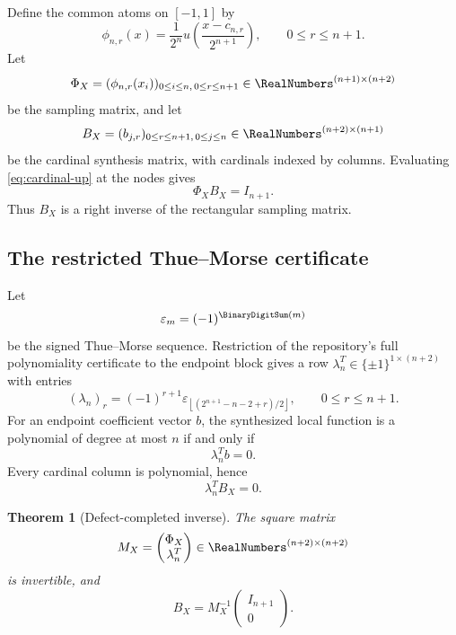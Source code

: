 \documentclass[11pt,oneside]{article}
\newtheorem{theorem}{Theorem}[section]
\theoremstyle{definition}
\theoremstyle{remark}
\newcommand{\eps}{\varepsilon}
\newcommand{\1}{\mathbf{1}}
\begin{document}
Define the common atoms on $[-1,1]$ by
\begin{equation}
 \phi_{n,r}(x)=\frac1{2^n}
 u\!\left(\frac{x-c_{n,r}}{2^{n+1}}\right),
 \qquad 0\le r\le n+1.
 \label{eq:phi-x}
\end{equation}
Let
\begin{equation}
 \Phi_X=(\phi_{n,r}(x_i))_{0\le i\le n,\,0\le r\le n+1}
 \in\RealNumbers^{(n+1)\times(n+2)}
 \label{eq:Phi}
\end{equation}
be the sampling matrix, and let
\begin{equation}
 B_X=(b_{j,r})_{0\le r\le n+1,\,0\le j\le n}
 \in\RealNumbers^{(n+2)\times(n+1)}
 \label{eq:B}
\end{equation}
be the cardinal synthesis matrix, with cardinals indexed by columns.
Evaluating \eqref{eq:cardinal-up} at the nodes gives
\begin{equation}
 \Phi_XB_X=I_{n+1}.
 \label{eq:right-inverse}
\end{equation}
Thus $B_X$ is a right inverse of the rectangular sampling matrix.

\subsection{The restricted Thue--Morse certificate}

Let
\[
 \eps_m=(-1)^{\BinaryDigitSum(m)}
\]
be the signed Thue--Morse sequence.  Restriction of the repository's full
polynomiality certificate to the endpoint block gives a row
$\lambda_n^T\in\{\pm1\}^{1\times(n+2)}$ with entries
\begin{equation}
 (\lambda_n)_r=(-1)^{r+1}
 \eps_{\left\lfloor(2^{n+1}-n-2+r)/2\right\rfloor},
 \qquad 0\le r\le n+1.
 \label{eq:lambda}
\end{equation}
For an endpoint coefficient vector $b$, the synthesized local function is a
polynomial of degree at most $n$ if and only if
\begin{equation}
 \lambda_n^Tb=0.
 \label{eq:certificate}
\end{equation}
Every cardinal column is polynomial, hence
\begin{equation}
 \lambda_n^TB_X=0.
 \label{eq:lambdaB}
\end{equation}

\begin{theorem}[Defect-completed inverse]
\label{thm:defect-completed}
The square matrix
\begin{equation}
 M_X=\begin{pmatrix}\Phi_X\\ \lambda_n^T\end{pmatrix}
 \in\RealNumbers^{(n+2)\times(n+2)}
 \label{eq:MX}
\end{equation}
is invertible, and
\begin{equation}
 \boxed{
 B_X=M_X^{-1}\begin{pmatrix}I_{n+1}\\0\end{pmatrix}.}
 \label{eq:B-Minverse}
\end{equation}
\end{theorem}
\end{document}
